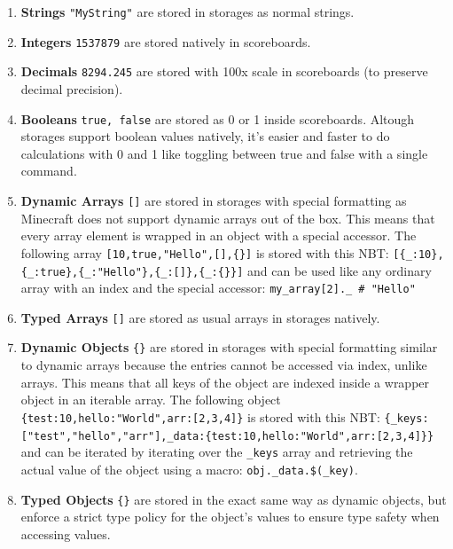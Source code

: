 \documentclass[12pt]{article}
\begin{document}
        \begin{enumerate}[label=\arabic*.,ref=\arabic*]
            \item \textbf{Strings} \lstinline{"MyString"} are stored in storages as normal strings.
            \item \textbf{Integers} \lstinline{1537879} are stored natively in scoreboards.
            \item \textbf{Decimals} \lstinline{8294.245} are stored with 100x scale in scoreboards (to preserve decimal precision).
            \item \textbf{Booleans} \lstinline{true, false} are stored as 0 or 1 inside scoreboards. Altough storages support boolean values natively, it's easier and faster to do calculations with 0 and 1 like toggling between true and false with a single command.
            \item \label{datatypes_dynamic_arrays} \textbf{Dynamic Arrays} \lstinline{[]} are stored in storages with special formatting as Minecraft does not support dynamic arrays out of the box. This means that every array element is wrapped in an object with a special accessor. The following array \lstinline|[10,true,"Hello",[],{}]| is stored with this NBT: \lstinline|[{_:10},{_:true},{_:"Hello"},{_:[]},{_:{}}]| and can be used like any ordinary array with an index and the special accessor: \lstinline{my_array[2]._ # "Hello"}
            \item \textbf{Typed Arrays} \lstinline{[]} are stored as usual arrays in storages natively.
            \item \label{datatypes_dynamic_objects} \textbf{Dynamic Objects} \lstinline|{}| are stored in storages with special formatting similar to dynamic arrays because the entries cannot be accessed via index, unlike arrays. This means that all keys of the object are indexed inside a wrapper object in an iterable array. The following object \lstinline|{test:10,hello:"World",arr:[2,3,4]}| is stored with this NBT: \lstinline|{_keys:["test","hello","arr"],_data:{test:10,hello:"World",arr:[2,3,4]}}| and can be iterated by iterating over the \lstinline{_keys} array and retrieving the actual value of the object using a macro: \lstinline{obj._data.$(_key)}.
            \item \textbf{Typed Objects} \lstinline|{}| are stored in the exact same way as dynamic objects, but enforce a strict type policy for the object's values to ensure type safety when accessing values.
        \end{enumerate}
        
\end{document}
